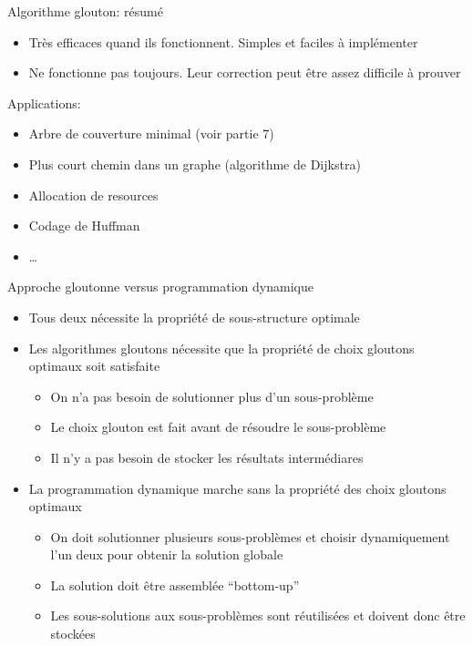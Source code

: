 \begin{frame}{Algorithme glouton: résumé}

\begin{itemize}
\item Très efficaces quand ils fonctionnent. Simples et faciles à
  implémenter
\item Ne fonctionne pas toujours. Leur correction peut être assez
  difficile à prouver
\end{itemize}

\bigskip

Applications:
\begin{itemize}
\item Arbre de couverture minimal (voir partie 7)
\item Plus court chemin dans un graphe (algorithme de Dijkstra)
\item Allocation de resources
\item Codage de Huffman
\item \ldots
\end{itemize}

\end{frame}

\begin{frame}{Approche gloutonne versus programmation dynamique}

\begin{itemize}
\item Tous deux nécessite la propriété de sous-structure optimale

\bigskip

\item Les algorithmes gloutons nécessite que la propriété de choix gloutons optimaux soit satisfaite
\begin{itemize}
\item On n'a pas besoin de solutionner plus d'un sous-problème
\item Le choix glouton est fait \alert{avant} de résoudre le sous-problème
\item Il n'y a pas besoin de stocker les résultats intermédiares
\end{itemize}

\bigskip

\item La programmation dynamique marche sans la propriété des choix gloutons optimaux
\begin{itemize}
\item On doit solutionner plusieurs sous-problèmes et choisir dynamiquement l'un deux pour obtenir la solution globale
\item La solution doit être assemblée ``bottom-up''
\item Les sous-solutions aux sous-problèmes sont réutilisées et doivent donc être stockées
\end{itemize}
\end{itemize}

\end{frame}

